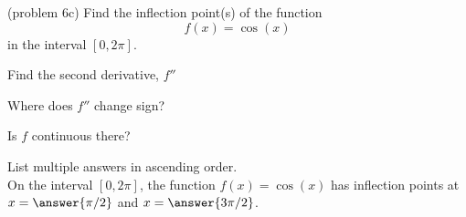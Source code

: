 \documentclass[handout]{ximera}
\begin{document}
\begin{problem}(problem 6c)
  Find the inflection point(s) of the function 
  \[
     f(x) = \cos(x)
  \]
	in the interval $[0, 2\pi].$\\
 
    \begin{hint}
      Find the second derivative, $f''$
    \end{hint}
		\begin{hint}
      Where does $f''$ change sign?
    \end{hint}
    \begin{hint}
      Is $f$ continuous there?
    \end{hint}  
		List multiple answers in ascending order.\\
	On the interval $[0, 2\pi]$, the function $f(x) = \cos(x)$ has inflection 
	points at $x =\answer{\pi/2}$ and $x=\answer{3\pi/2}$.
		
	
\end{problem}
\end{document}

